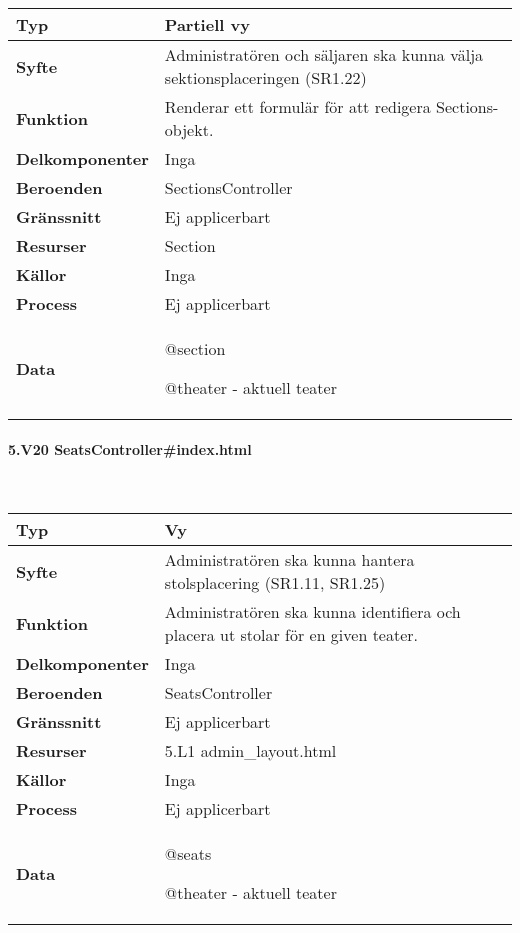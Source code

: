 \documentclass[a4paper, twoside, 11pt, titlepage]{article}
\begin{document}
			\begin {table} [ht] \begin{tabular} {  p{3.5cm} p{11.6cm} }
				\hline
				{\sffamily\textbf{Typ}} & {Partiell vy} \\
				\hline
				{\sffamily\textbf{Syfte}} & {Administratören och säljaren ska kunna välja sektionsplaceringen (SR1.22)} \\
				\hline
				{\sffamily\textbf{Funktion}} & {Renderar ett formulär för att redigera Sections-objekt.} \\
				\hline
				{\sffamily\textbf{Delkomponenter}} & {Inga} \\
				\hline
				{\sffamily\textbf{Beroenden}} & {SectionsController} \\
				\hline
				{\sffamily\textbf{Gränssnitt}} & {Ej applicerbart} \\
				\hline
				{\sffamily\textbf{Resurser}} & {Section} \\
				\hline
				{\sffamily\textbf{Källor}} & {Inga} \\
				\hline
				{\sffamily\textbf{Process}} & {Ej applicerbart} \\
				\hline
				{\sffamily\textbf{Data}} & {@section

@theater - aktuell teater} \\
				\hline
			\end{tabular} \end{table} \FloatBarrier


			\paragraph{5.V20 SeatsController\#index.html}\

			\begin {table} [ht] \begin{tabular} {  p{3.5cm} p{11.6cm} }
				\hline
				{\sffamily\textbf{Typ}} & {Vy} \\
				\hline
				{\sffamily\textbf{Syfte}} & {Administratören ska kunna hantera stolsplacering (SR1.11, SR1.25)} \\
				\hline
				{\sffamily\textbf{Funktion}} & {Administratören ska kunna identifiera och placera ut stolar för en given teater.} \\
				\hline
				{\sffamily\textbf{Delkomponenter}} & {Inga} \\
				\hline
				{\sffamily\textbf{Beroenden}} & {SeatsController} \\
				\hline
				{\sffamily\textbf{Gränssnitt}} & {Ej applicerbart} \\
				\hline
				{\sffamily\textbf{Resurser}} & {5.L1 admin\_layout.html} \\
				\hline
				{\sffamily\textbf{Källor}} & {Inga} \\
				\hline
				{\sffamily\textbf{Process}} & {Ej applicerbart} \\
				\hline
				{\sffamily\textbf{Data}} & {@seats

@theater - aktuell teater} \\
				\hline
			\end{tabular} \end{table} \FloatBarrier
\end{document}
